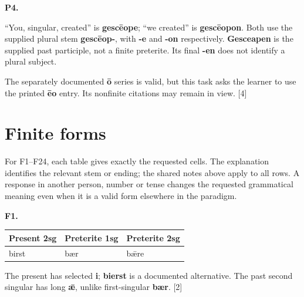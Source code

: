 \par\begin{minipage}{\linewidth}\raggedright
\textbf{P4.}

“You, singular, created” is \textbf{gescēope}; “we created” is \textbf{gescēopon}. Both use the supplied plural stem \textbf{gescēop-}, with \textbf{-e} and \textbf{-on} respectively. \textbf{Gesceapen} is the supplied past participle, not a finite preterite. Its final \textbf{-en} does not identify a plural subject.

The separately documented \textbf{ō} series is valid, but this task asks the learner to use the printed \textbf{ēo} entry. Its nonfinite citations may remain in view. [4]

\end{minipage}\par\addvspace{4pt}

\section*{Finite forms}

For F1–F24, each table gives exactly the requested cells. The explanation identifies the relevant stem or ending; the shared notes above apply to all rows. A response in another person, number or tense changes the requested grammatical meaning even when it is a valid form elsewhere in the paradigm.

\par\begin{minipage}{\linewidth}\raggedright
\textbf{F1.}

\par\begingroup
\fontsize{10.5}{13.2}\selectfont
\setlength{\LTleft}{0pt}\setlength{\LTright}{\fill}
\noindent
\begin{tabular}{@{}>{\raggedright\arraybackslash}p{37.46mm}>{\raggedright\arraybackslash}p{40.46mm}>{\raggedright\arraybackslash}p{40.46mm}@{}}
\toprule
\textbf{Present 2sg} & \textbf{Preterite 1sg} & \textbf{Preterite 2sg} \\
\midrule
birst & bær & bǣre \\
\bottomrule
\end{tabular}
\par\endgroup

The present has selected \textbf{i}; \textbf{bierst} is a documented alternative. The past second singular has long \textbf{ǣ}, unlike first-singular \textbf{bær}. [2]

\end{minipage}\par\addvspace{4pt}


